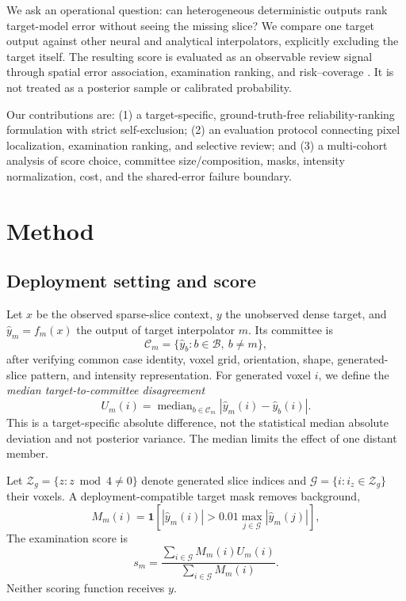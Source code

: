 \documentclass{article}
\begin{document}
We ask an operational question: can heterogeneous deterministic outputs rank target-model error without seeing the missing slice? We compare one target output against other neural and analytical interpolators, explicitly excluding the target itself. The resulting score is evaluated as an observable review signal through spatial error association, examination ranking, and risk--coverage \cite{elyaniv2010selective,ding2020aurc}. It is not treated as a posterior sample or calibrated probability.

Our contributions are: (1) a target-specific, ground-truth-free reliability-ranking formulation with strict self-exclusion; (2) an evaluation protocol connecting pixel localization, examination ranking, and selective review; and (3) a multi-cohort analysis of score choice, committee size/composition, masks, intensity normalization, cost, and the shared-error failure boundary.

\section{Method}
\label{sec:method}

\subsection{Deployment setting and score}
Let $x$ be the observed sparse-slice context, $y$ the unobserved dense target, and $\hat y_m=f_m(x)$ the output of target interpolator $m$. Its committee is
\begin{equation}
  \mathcal C_m=\{\hat y_b:b\in\mathcal B,\ b\neq m\},
\end{equation}
after verifying common case identity, voxel grid, orientation, shape, generated-slice pattern, and intensity representation. For generated voxel $i$, we define the \emph{median target-to-committee disagreement}
\begin{equation}
 U_m(i)=\mathop{\mathrm{median}}_{b\in\mathcal C_m}
 \left|\hat y_m(i)-\hat y_b(i)\right| .
 \label{eq:score}
\end{equation}
This is a target-specific absolute difference, not the statistical median absolute deviation and not posterior variance. The median limits the effect of one distant member.

Let $\mathcal Z_g=\{z:z\bmod4\neq0\}$ denote generated slice indices and $\mathcal G=\{i:i_z\in\mathcal Z_g\}$ their voxels. A deployment-compatible target mask removes background,
\begin{equation}
 M_m(i)=\mathbf1\!\left[|\hat y_m(i)|>0.01\max_{j\in\mathcal G}|\hat y_m(j)|\right],
\end{equation}
The examination score is
\begin{equation}
 s_m=\frac{\sum_{i\in\mathcal G}M_m(i)U_m(i)}
 {\sum_{i\in\mathcal G}M_m(i)} .
\end{equation}
Neither scoring function receives $y$.
\end{document}
